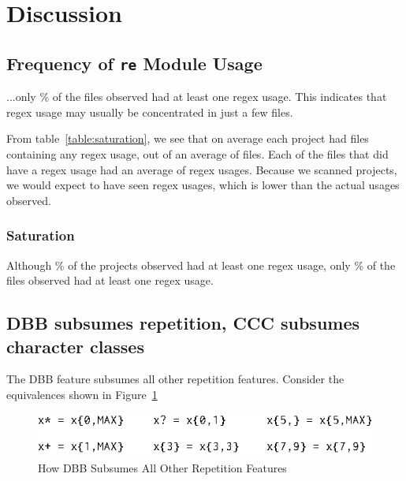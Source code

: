 \section{Discussion}
\label{sec:discussion}

\subsection{Frequency of {\tt re} Module Usage}
...only \% of the files observed had at least one regex usage.  This indicates that regex usage may usually be concentrated in just a few files.


From table~\ref{table:saturation}, we see that on average each project had  files containing any regex usage, out of an average of  files.  Each of the files that did have a regex usage had an average of  regex usages.  Because we scanned  projects, we would expect to have seen  regex usages, which is lower than the actual  usages observed.
\subsubsection{Saturation}Although \% of the projects observed had at least one regex usage, only \% of the files observed had at least one regex usage.



\subsection{DBB subsumes repetition, CCC subsumes character classes}

The DBB feature subsumes all other repetition features.  Consider the equivalences shown in Figure~\ref{fig:DBBequivalences}

\begin{figure}[htb]
\centering
\includegraphics[width=\columnwidth]{../illustrations/DBBequivalences.eps}
\caption{How DBB Subsumes All Other Repetition Features}
\label{fig:DBBequivalences}
\end{figure}

